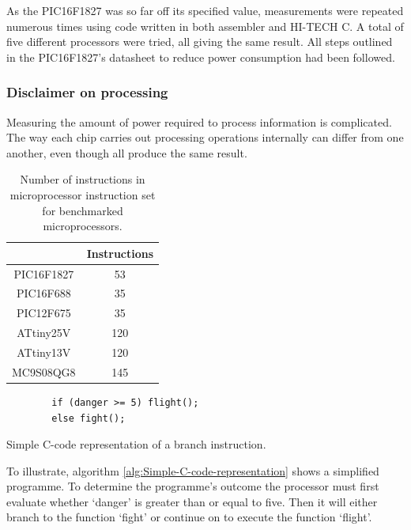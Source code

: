       As the PIC16F1827 was so far off its specified value, measurements were repeated numerous times using code written in both assembler and HI-TECH C.
      A total of five different processors were tried, all giving the same result.
      All steps outlined in the PIC16F1827's datasheet to reduce power consumption had been followed.


    \subsubsection*{Disclaimer on processing}


      Measuring the amount of power required to process information is complicated.
      The way each chip carries out processing operations internally can differ from one another, even though all produce the same result.

      \begin{table}
        \centering
        \begin{tabular}{|c|c|}
          \cline{2-2}
          \multicolumn{1}{c|}{} & Instructions\tabularnewline
          \hline
          PIC16F1827 & 53\tabularnewline
          \hline
          PIC16F688 & 35\tabularnewline
          \hline
          PIC12F675 & 35\tabularnewline
          \hline
          ATtiny25V & 120\tabularnewline
          \hline
          ATtiny13V & 120\tabularnewline
          \hline
          MC9S08QG8 & 145\tabularnewline
          \hline
        \end{tabular}
        \caption{\label{tab:Number-of-instructions}Number of instructions in microprocessor instruction set for benchmarked microprocessors.}
      \end{table}


      \begin{algorithm}
        \begin{lstlisting}
        if (danger >= 5) flight();
        else fight();
        \end{lstlisting}
        \caption{\label{alg:Simple-C-code-representation}Simple C-code representation of a branch instruction.}
      \end{algorithm}


      To illustrate, algorithm \ref{alg:Simple-C-code-representation} shows a simplified programme.
      To determine  the programme's outcome the processor must first evaluate whether `danger' is greater than or equal to five.
      Then it will either branch to the function `fight' or continue on to execute the function `flight'.

